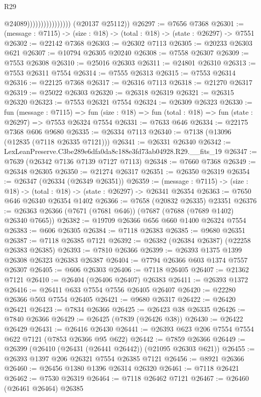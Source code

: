 \begin{lexlean}{R29}
\begin{coremodule}
                                      @24089))))))))))))))))
      (@20137 @25112))
@26297 := @7656 @7368
@26301 := (message : @7115) -> (size : @18) -> (total : @18) -> (state : @26297) -> @7551
@26302 := @22142 @7368
@26303 := @26302 @7113
@26305 := @20233 @26303 @621
@26307 := @10794 @26305 @20240
@26308 := @7558 @26307
@26309 := @7553 @26308
@26310 := @25016 @26303
@26311 := @24801 @26310
@26313 := @7553 @26311 @7554
@26314 := @7555 @26313
@26315 := @7553 @26314
@26316 := @22125 @7368
@26317 := @26316 @7113
@26318 := @21270 @26317
@26319 := @25022 @26303
@26320 := @26318 @26319
@26321 := @26315 @26320
@26323 := @7553 @26321 @7554
@26324 := @26309 @26323
@26330 := fun (message : @7115) =>
  fun (size : @18) => fun (total : @18) => fun (state : @26297) => @7553 @26324 @7554
@26331 := @7633 @646
@26334 := @22175 @7368 @606 @9680
@26335 := @26334 @7113
@26340 := @7138 (@13096 (@12835 (@7118 @26335 @7121)))
@26341 := @26331 @26340
@26342 := LexLeanPreserve.C3be289e6dfa0da8c188e3fd73ab04928.R29.__fits_19
@26347 := @7639 (@26342 @7136 @7139 @7127 @7113)
@26348 := @7660 @7368
@26349 := @26348 @26305
@26350 := @21274 @26317
@26351 := @26350 @26319
@26354 := @26347 (@26334 (@26349 @26351))
@26359 := (message : @7115) -> (size : @18) -> (total : @18) -> (state : @26297) -> @26341 @26354
@26363 := @7650 @646 @26340 @26354 @1402
@26366 := @7658 (@20832 @26335) @23351
@26376 := @26363 @26366 (@7671 (@7681 @646)) (@7687 (@7688 (@7689 @1402) @26340 @7665))
@26382 := @19709 @26366 @656 @660 @1400 @26324 @7554
@26383 := @606 @26305
@26384 := @7118 @26383
@26385 := @9680 @26351
@26387 := @7118 @26385 @7121
@26392 := @26382 (@26384 @26387) (@22258 @26383 @26385)
@26393 := @7810 @26366
@26399 := @26393 @1375 @1399 @26308 @26323 @26383 @26387
@26404 := @7794 @26366 @603 @1374 @7557 @26307
@26405 := @606 @26303
@26406 := @7118 @26405
@26407 := @21362 @7121
@26410 := @26404 (@26406 @26407) @26383
@26411 := @26393 @1372
@26416 := @26411 @633 @7554 @7556 @26405 @26407
@26420 := @22280 @26366 @503 @7554 @26405
@26421 := @9680 @26317
@26422 := @26420 @26421
@26423 := @7834 @26366
@26425 := @26423 @38 @26335
@26426 := @7840 @26366
@26429 := @26425 (@7839 (@26426 @38))
@26430 := @26422 @26429
@26431 := @26416 @26430
@26441 := @26393 @623 @206 @7554 @7554 @622 @7121 (@7853 @26366 @95 @622)
@26442 := @7859 @26366
@26449 := @26399 (@26410 (@26431 (@26441 @26442)) (@21095 @26303 @621))
@26455 := @26393 @1397 @206 @26321 @7554 @26385 @7121
@26456 := @8921 @26366
@26460 := @26456 @1380 @1396 @26314 @26320
@26461 := @7118 @26421
@26462 := @7530 @26319
@26464 := @7118 @26462 @7121
@26467 := @26460 (@26461 @26464) @26385

\end{coremodule}
\end{lexlean}
